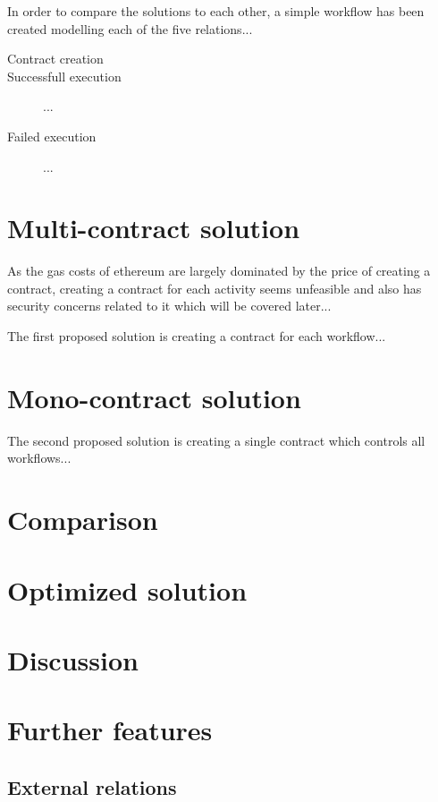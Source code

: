 \documentclass{paper}
\begin{document}
	In order to compare the solutions to each other, a simple workflow has been created modelling each of the five relations...

	\begin{description}
		\item[Contract creation]
		\item[Successfull execution] ...
		\item[Failed execution] ... 
	\end{description}

	\section{Multi-contract solution}

	As the gas costs of ethereum are largely dominated by the price of creating a contract, creating a contract for each activity seems unfeasible and also has security concerns related to it which will be covered later...

	The first proposed solution is creating a contract for each workflow...

	\section{Mono-contract solution}

	The second proposed solution is creating a single contract which controls all workflows...

	\section{Comparison}

	\section{Optimized solution}

	\section{Discussion}

	\section{Further features}

		\subsection{External relations}
\end{document}
